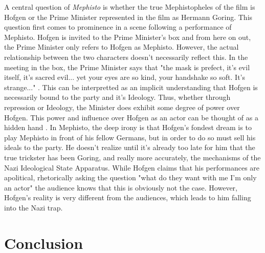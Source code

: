 \documentclass[a4paper, 11pt]{article} %
\begin{document}
A central question of \textit{Mephisto} is whether the true Mephistopheles of the film is Hofgen or the Prime Minister represented in the film as Hermann Goring.  This question first comes to prominence in a scene following a performance of Mephisto.  Hofgen is invited to the Prime Minister's box and from here on out, the Prime Minister only refers to Hofgen as Mephisto.  However, the actual relationship between the two characters doesn't necessarily reflect this.  In the meeting in the box, the Prime Minister says that "the mask is prefect, it's evil itself, it's sacred evil... yet your eyes are so kind, your handshake so soft.  It's strange..." \cite{MephistoFilm}.  This can be interpretted as an implicit understanding that Hofgen is necessarily bound to the party and it's Ideology.  Thus, whether through repression or Ideology, the Minister does exhibit some degree of power over Hofgen.  This power and influence over Hofgen as an actor can be thought of as a hidden hand \cite{Lecture2}.  In Mephisto, the deep irony is that Hofgen's fondest dream is to play Mephisto in front of his fellow Germans, but in order to do so must sell his ideals to the party.  He doesn't realize until it's already too late for him that the true trickster has been Goring, and really more accurately, the mechanisms of the Nazi Ideological State Apparatus.  While Hofgen claims that his performances are apolitical, rhetorically asking the question "what do they want with me I'm only an actor" \cite{MephistoFilm} the audience knows that this is obviously not the case.  However, Hofgen's reality is very different from the audiences, which leads to him falling into the Nazi trap.  




\section*{Conclusion}
\end{document}
